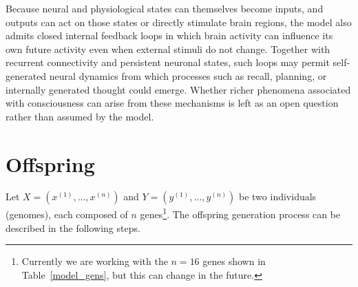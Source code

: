 \documentclass[12pt,a4paper]{article}
\begin{document}
	Because neural and physiological states can themselves become inputs, and outputs can act on those states or directly stimulate brain regions, the model also admits closed internal feedback loops in which brain activity can influence its own future activity even when external stimuli do not change. Together with recurrent connectivity and persistent neuronal states, such loops may permit self-generated neural dynamics from which processes such as recall, planning, or internally generated thought could emerge. Whether richer phenomena associated with consciousness can arise from these mechanisms is left as an open question rather than assumed by the model.

\section{Offspring}

	Let $X = (x^{(1)}, \ldots, x^{(n)})$ and $Y = (y^{(1)}, \ldots, y^{(n)})$ be two individuals (genomes), each composed of $n$ genes\footnote{Currently we are working with the $n = 16$ genes shown in Table~\ref{model_gens}, but this can change in the future.}. The offspring generation process can be described in the following steps.
	
\end{document}
